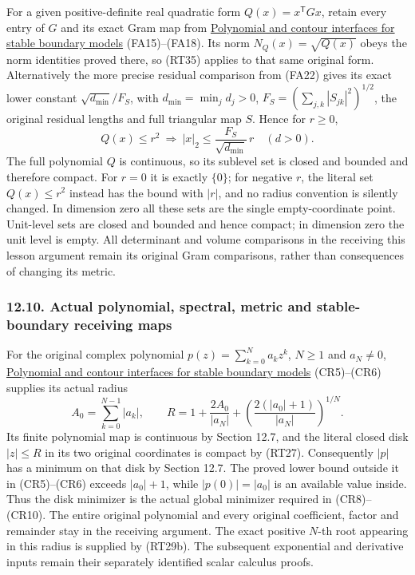 \documentclass[
  11pt,
]{article}
\begin{document}
For a given positive-definite real quadratic form
\(Q(x)=x^{\mathsf T}Gx\), retain every entry of \(G\) and its exact Gram
map from \href{stable-prerequisite-bridges.pdf}{Polynomial and contour
interfaces for stable boundary models} (FA15)--(FA18). Its norm
\(N_Q(x)=\sqrt{Q(x)}\) obeys the norm identities proved there, so (RT35)
applies to that same original form. Alternatively the more precise
residual comparison from (FA22) gives its exact lower constant
\(\sqrt{d_{\min}}/F_S\), with \(d_{\min}=\min_jd_j>0\),
\(F_S=(\sum_{j,k}|S_{jk}|^2)^{1/2}\), the original residual lengths and
full triangular map \(S\). Hence for \(r\ge0\), \[
Q(x)\le r^2
\ \Longrightarrow\
|x|_2\le \frac{F_S}{\sqrt{d_{\min}}}\,r
\quad(d>0).
\tag{RT37}
\] The full polynomial \(Q\) is continuous, so its sublevel set is
closed and bounded and therefore compact. For \(r=0\) it is exactly
\(\{0\}\); for negative \(r\), the literal set \(Q(x)\le r^2\) instead
has the bound with \(|r|\), and no radius convention is silently
changed. In dimension zero all these sets are the single
empty-coordinate point. Unit-level sets are closed and bounded and hence
compact; in dimension zero the unit level is empty. All determinant and
volume comparisons in the receiving this lesson argument remain its
original Gram comparisons, rather than consequences of changing its
metric.

\subsubsection{12.10. Actual polynomial, spectral, metric and
stable-boundary receiving
maps}\label{actual-polynomial-spectral-metric-and-stable-boundary-receiving-maps}

For the original complex polynomial \(p(z)=\sum_{k=0}^N a_kz^k\),
\(N\ge1\) and \(a_N\ne0\),
\href{stable-prerequisite-bridges.pdf}{Polynomial and contour interfaces
for stable boundary models} (CR5)--(CR6) supplies its actual radius \[
A_0=\sum_{k=0}^{N-1}|a_k|,\qquad
R=1+\frac{2A_0}{|a_N|}
+\left(\frac{2(|a_0|+1)}{|a_N|}\right)^{1/N}.
\tag{RT38}
\] Its finite polynomial map is continuous by Section 12.7, and the
literal closed disk \(|z|\le R\) in its two original coordinates is
compact by (RT27). Consequently \(|p|\) has a minimum on that disk by
Section 12.7. The proved lower bound outside it in (CR5)--(CR6) exceeds
\(|a_0|+1\), while \(|p(0)|=|a_0|\) is an available value inside. Thus
the disk minimizer is the actual global minimizer required in
(CR8)--(CR10). The entire original polynomial and every original
coefficient, factor and remainder stay in the receiving argument. The
exact positive \(N\)-th root appearing in this radius is supplied by
(RT29b). The subsequent exponential and derivative inputs remain their
separately identified scalar calculus proofs.
\end{document}
